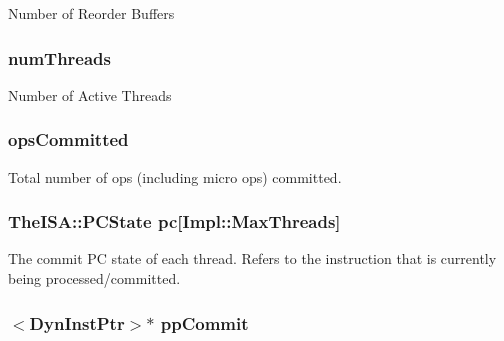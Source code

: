 \label{classDefaultCommit_a35ee8ef405428b8d8595176ea6581681}
Number of Reorder Buffers \hypertarget{classDefaultCommit_a88377f855dbf5adeeecb06b5bb821d35}{
\subsubsection[{numThreads}]{ {\bf numThreads}}}
\label{classDefaultCommit_a88377f855dbf5adeeecb06b5bb821d35}
Number of Active Threads \hypertarget{classDefaultCommit_a1549eb9ffd1727a5c1937e7520a0bcc8}{
\subsubsection[{opsCommitted}]{ {\bf opsCommitted}}}
\label{classDefaultCommit_a1549eb9ffd1727a5c1937e7520a0bcc8}
Total number of ops (including micro ops) committed. \hypertarget{classDefaultCommit_a6e6091c9272a281b8693c0f46279cad0}{
\subsubsection[{pc}]{\setlength{\rightskip}{0pt plus 5cm}TheISA::PCState {\bf pc}\mbox{[}Impl::MaxThreads\mbox{]}}}
\label{classDefaultCommit_a6e6091c9272a281b8693c0f46279cad0}
The commit PC state of each thread. Refers to the instruction that is currently being processed/committed. \hypertarget{classDefaultCommit_ae41ff03242cc6980c072e3ea824168ed}{
\subsubsection[{ppCommit}]{$<${\bf DynInstPtr}$>$$\ast$ {\bf ppCommit}}}
